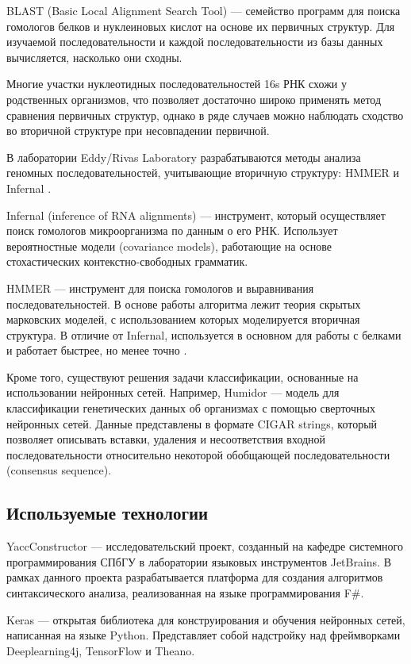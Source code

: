 \documentclass[14pt]{matmex-diploma}
\begin{document}
BLAST (Basic Local Alignment Search Tool) \cite{6} --- семейство программ для поиска гомологов белков и нуклеиновых кислот на основе их первичных структур. Для изучаемой последовательности и каждой последовательности из базы данных вычисляется, насколько они сходны. 

Многие участки нуклеотидных последовательностей 16s РНК схожи у родственных организмов, что позволяет достаточно широко применять метод сравнения первичных структур, однако в ряде случаев можно наблюдать сходство во вторичной структуре при несовпадении первичной.

В лаборатории Eddy/Rivas Laboratory \cite{7} разрабатываются методы анализа геномных последовательностей, учитывающие вторичную структуру: HMMER \cite{8} и Infernal \cite{9}.

Infernal (inference of RNA alignments) --- инструмент, который осуществляет поиск гомологов микроорганизма по данным о его РНК. Использует вероятностные модели (covariance models), работающие на основе стохастических контекстно-свободных грамматик.

HMMER --- инструмент для поиска гомологов и выравнивания последовательностей. В основе работы алгоритма лежит теория скрытых марковских моделей, с использованием которых моделируется вторичная структура. В отличие от Infernal, используется в основном для работы с белками и работает быстрее, но менее точно \cite{13}.

Кроме того, существуют решения задачи классификации, основанные на использовании нейронных сетей. Например, Humidor \cite{17} --- модель для классификации генетических данных об организмах с помощью сверточных нейронных сетей. Данные представлены в формате CIGAR strings, который позволяет описывать вставки, удаления и несоответствия входной последовательности относительно некоторой обобщающей последовательности (consensus sequence).

\subsection{Используемые технологии}
YaccConstructor \cite{15} --- исследовательский проект, созданный на кафедре системного программирования СПбГУ в лаборатории языковых инструментов JetBrains. В рамках данного проекта разрабатывается платформа для создания алгоритмов синтаксического анализа, реализованная на языке программирования F\#. 

Keras \cite{16} --- открытая библиотека для конструирования и обучения нейронных сетей, написанная на языке Python. Представляет собой надстройку над фреймворками Deeplearning4j, TensorFlow и Theano.
\end{document}
